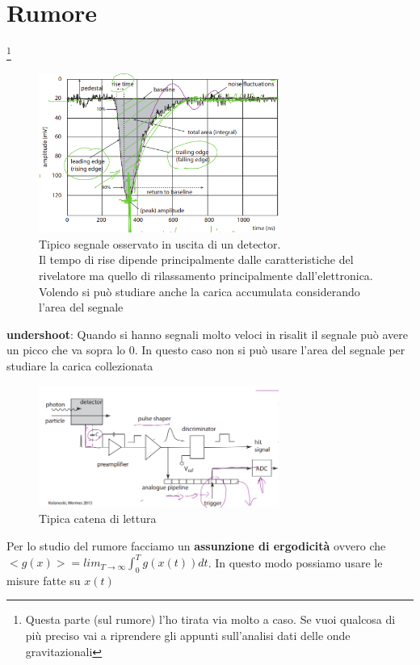 \section{Rumore}\footnote{Questa parte (sul rumore) l'ho tirata via molto a caso. Se vuoi qualcosa di più preciso vai a riprendere gli appunti sull'analisi dati delle onde gravitazionali}
\begin{figure}[H]
    \centering
    \includegraphics[width=0.7\textwidth,frame]{Chapters/images/Interazione_radiazione_materia/image-20220223230311045.png}
    \captionsetup{width=0.7\textwidth}
    \caption{Tipico segnale osservato in uscita di un detector.\\ Il tempo di rise dipende principalmente dalle caratteristiche del rivelatore ma quello di rilassamento principalmente dall'elettronica.\\ Volendo si può studiare anche la carica accumulata considerando l'area del segnale}
\end{figure}

\begin{definition*}
    \textbf{undershoot}: Quando si hanno segnali molto veloci in risalit il segnale può avere un picco che va sopra lo 0. 
In questo caso non si può usare l'area del segnale per studiare la carica collezionata

\end{definition*}

\begin{figure}[H]
    \centering
    \includegraphics[width=0.7\textwidth,frame]{Chapters/images/Interazione_radiazione_materia/image-20220223230709058.png}
    \captionsetup{width=0.7\textwidth}
    \caption{Tipica catena di lettura}
\end{figure}
Per lo studio del rumore facciamo un \textbf{assunzione di ergodicità} ovvero che $<g(x)>=lim_{T\to \infty} \int_0^T g(x(t))dt$. In questo modo possiamo usare le misure fatte su $x(t)$

